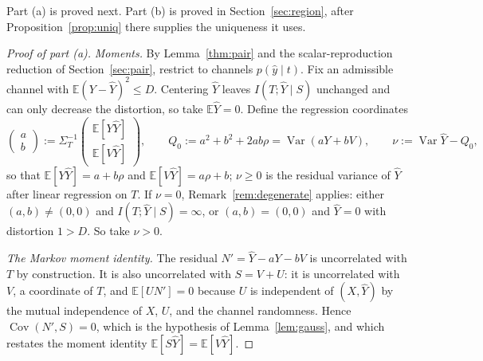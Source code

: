 \documentclass[11pt,onecolumn]{IEEEtran}
\newcommand{\E}{\mathbb{E}}
\newcommand{\Cov}{\operatorname{Cov}}
\newcommand{\hY}{\widehat{Y}}
\begin{document}
Part (a) is proved next. Part (b) is proved in Section~\ref{sec:region},
after Proposition~\ref{prop:uniq} there supplies the uniqueness it uses.

\begin{proof}[Proof of part (a)]
\emph{Moments.} By Lemma~\ref{thm:pair} and the scalar-reproduction
reduction of Section~\ref{sec:pair}, restrict to channels
$p(\hat y\mid t)$. Fix an admissible channel with
$\E(Y-\hY)^2\le D$. Centering $\hY$ leaves $I(T;\hY\mid S)$ unchanged
and can only decrease the distortion, so take $\E\hY=0$. Define the
regression coordinates
\[
\begin{pmatrix}a\\b\end{pmatrix}
:=\Sigma_T^{-1}\begin{pmatrix}\E[Y\hY]\\ \E[V\hY]\end{pmatrix},
\qquad
Q_0:=a^2+b^2+2ab\rho=\operatorname{Var}(aY+bV),
\qquad
\nu:=\operatorname{Var}\hY-Q_0,
\]
so that $\E[Y\hY]=a+b\rho$ and $\E[V\hY]=a\rho+b$; $\nu\ge0$ is the
residual variance of $\hY$ after linear regression on $T$. If $\nu=0$,
Remark~\ref{rem:degenerate} applies: either $(a,b)\ne(0,0)$ and
$I(T;\hY\mid S)=\infty$, or $(a,b)=(0,0)$ and $\hY=0$ with distortion
$1>D$. So take $\nu>0$.

\emph{The Markov moment identity.} The residual $N'=\hY-aY-bV$ is
uncorrelated with $T$ by construction. It is also uncorrelated with
$S=V+U$: it is uncorrelated with $V$, a coordinate of $T$, and
$\E[UN']=0$ because $U$ is independent of $(X,\hY)$ by the mutual
independence of $X$, $U$, and the channel randomness. Hence
$\Cov(N',S)=0$, which is the hypothesis of Lemma~\ref{lem:gauss}, and
which restates the moment identity $\E[S\hY]=\E[V\hY]$.


\end{proof}
\end{document}
